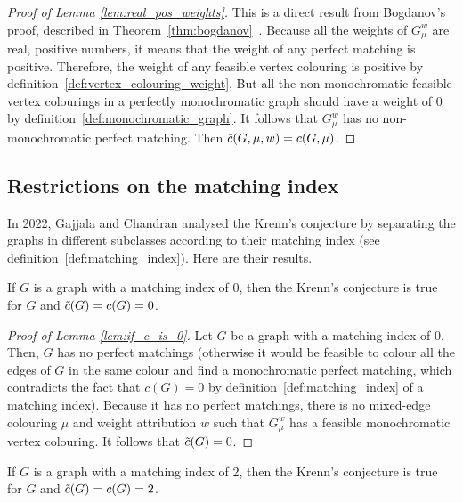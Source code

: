 \begin{proof}[Proof of Lemma \ref{lem:real_pos_weights}]
    This is a direct result from Bogdanov's proof, described in Theorem~\ref{thm:bogdanov}~\cite{bogdanov}.
    Because all the weights of $G_\mu^w$ are real, positive numbers, it means that the weight of any perfect matching is positive.
    Therefore, the weight of any feasible vertex colouring is positive by definition~\ref{def:vertex_colouring_weight}.
    But all the non-monochromatic feasible vertex colourings in a perfectly monochromatic graph should have a weight of 0 by definition~\ref{def:monochromatic_graph}.
    It follows that $G_\mu^w$ has no non-monochromatic perfect matching.
    Then $\Tilde{c}(G, \mu, w) = c(G, \mu)$.
\end{proof}


\subsection{Restrictions on the matching index}
\label{subsec:proved-special-cases-matching-index}

In 2022, Gajjala and Chandran analysed the Krenn's conjecture by separating the graphs in different subclasses according to their matching index (see definition~\ref{def:matching_index}).
Here are their results.

\begin{lemma}
    \label{lem:if_c_is_0}
    If $G$ is a graph with a matching index of 0, then the Krenn's conjecture is true for $G$ and $\Tilde{c}(G) = c(G) = 0$.
\end{lemma}

\begin{proof}[Proof of Lemma \ref{lem:if_c_is_0}]
    Let $G$ be a graph with a matching index of 0.
    Then, $G$ has no perfect matchings (otherwise it would be feasible to colour all the edges of $G$ in the same colour and find a monochromatic perfect matching, which contradicts the fact that $c(G) = 0$ by definition~\ref{def:matching_index} of a matching index).
    Because it has no perfect matchings, there is no mixed-edge colouring $\mu$ and weight attribution $w$ such that $G_\mu^w$ has a feasible monochromatic vertex colouring.
    It follows that $\Tilde{c}(G) = 0$.
\end{proof}

\begin{lemma}
    \label{lem:if_c_is_2}
    If $G$ is a graph with a matching index of 2, then the Krenn's conjecture is true for $G$ and $\Tilde{c}(G) = c(G) = 2$.
\end{lemma}


